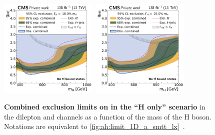 \begin{figure}[!ph]
    \\
    \includegraphics[width=0.42\textwidth]{figures/ah/limits_combined/smtt/H_limit_w18p0_g-scan.pdf}%
    \hspace*{0.05\textwidth}%
    \includegraphics[width=0.42\textwidth]{figures/ah/limits_combined/smtt/H_limit_w25p0_g-scan.pdf}
    \caption{%
    \textbf{Combined exclusion limits on \gHtt in the ``H only'' scenario} in the dilepton and \ljets channels as a function of the mass of the H boson. Notations are equivalent to \cref{fig:ah:limit_1D_a_smtt_lx}~\cite{CMS:HIG-22-013}.
    }
    \label{fig:ah:limit_1D_h_smtt_lx}
\end{figure}

